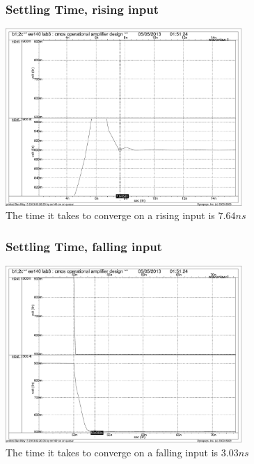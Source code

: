 \documentclass[]{article}
\begin{document}
		\begin{figure}
				\subsubsection{Settling Time, rising input}
				\includegraphics[width=0.8\textwidth]{SETTLING_TIME_rise_FINAL.pdf}
				\caption{The time it takes to converge on a rising input is $7.64ns$}
		\end{figure}
		
		\begin{figure}
				\subsubsection{Settling Time, falling input}
				\includegraphics[width=0.8\textwidth]{SETTLING_TIME_fall_FINAL.pdf}
				\caption{The time it takes to converge on a falling input is $3.03ns$}
		\end{figure}
		$$$$
		\newpage
\end{document}
